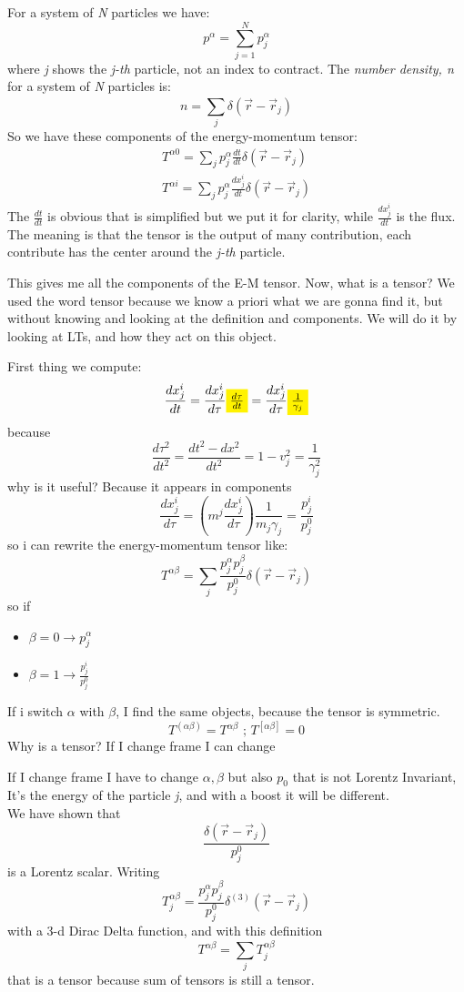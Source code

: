 For a system of \emph{N} particles we have: 
\[
p^{\alpha } = \sum_{j=1}^{N}{p^{\alpha }_{j}}	 
\]
where \emph{j} shows the \emph{j-th} particle, not an index to contract.
The \emph{number density, n} for a system of \emph{N} particles is:
\[
n = \sum_{j}^{}{\delta\left( \vec{r}-\vec{r}_{j} \right)}
\]
So we have these components of the energy-momentum tensor:
\begin{gather*}
T^{\alpha 0} = \sum_{j}^{}{p^{\alpha }_{j} \frac{dt}{dt} \delta\left( \vec{r}-\vec{r}_{j} \right)} \\
T^{\alpha i} = \sum_{j}^{}{p^{\alpha }_{j} \frac{dx^{i}_{j}}{dt} \delta\left( \vec{r}-\vec{r}_{j} \right) }
\end{gather*}
The $\frac{dt}{dt}$ is obvious that is simplified but we put it for clarity, while $ \frac{dx^{i}_{j}}{dt} $ is the flux.
The meaning is that the tensor is the output of many contribution, each contribute has the center around the \emph{j-th} particle.

This gives me all the components of the E-M tensor. Now, what is a tensor? We used the word tensor because we know a priori what we are gonna find it, but without knowing and looking at the definition and components. We will do it by looking at LTs, and how they act on this object.

First thing we compute:
\[
\frac{ dx^{i}_{j}}{dt} = \frac{ dx^{i}_{j}}{d\tau } \colorbox{yellow}{$ \frac{d\tau }{dt}$} = \frac{dx^{i}_{j}}{d\tau } \colorbox{yellow}{$ \frac{1}{\gamma_{j}}$}
\]
because
\[
\frac{d\tau ^{2}}{dt^{2}} = \frac{dt^{2}-dx^{2}}{dt^{2}} = 1 - v^{2}_{j} = \frac{1}{\gamma^{2}_{j}}
\]
why is it useful? Because it appears in components
\[
\frac{dx^{i}_{j}}{d\tau } = \left( m^{j} \frac{dx^{i}_{j}}{d\tau } \right) \frac{1}{m_{j}\gamma_{j}} = \frac{p^{i}_{j}}{p^{0}_{j}}		
\]
so i can rewrite the energy-momentum tensor like:
\[
T^{\alpha \beta } = \sum_{j}^{}{\frac{ p^{\alpha }_{j}p^{\beta }_{j}}{p^{0}_{j}}\delta\left( \vec{r}-\vec{r}_{j} \right)}
\]
so if 
\begin{itemize}
	\item $\beta =0 \to p^{\alpha }_{j}$ 
	\item $\beta =1 \to \frac{p^{i}_{j}}{p^{0}_{j}}$
\end{itemize}
If i switch $\alpha $ with $\beta $, I find the same objects, because the tensor is symmetric.
\[
	T^{\left( \alpha \beta  \right)} = T^{\alpha \beta } \text{  ;   } T^{[\alpha \beta ]} = 0
\]
Why is a tensor? If I change frame I can change 

If I change frame I have to change $\alpha , \beta $ but also $p_{0}$ that is not Lorentz Invariant, It's the energy of the particle \emph{j}, and with a boost it will be different.\\
We have shown that 
\[
\frac{\delta\left( \vec{r}-\vec{r}_{j} \right)}{p^{0}_{j}}
\]
is a Lorentz scalar. 
Writing
\[
T^{\alpha \beta }_{j}= \frac{p^{\alpha }_{j}p^{\beta }_{j}}{p^{0}_{j}} \delta^{\left( 3 \right)}\left( \vec{r}-\vec{r}_{j} \right) 
\]
with a 3-d Dirac Delta function, and with this definition 
\[
T^{\alpha  \beta } = \sum_{j}^{}{T^{\alpha \beta }_{j}}
\]
that is a tensor because sum of tensors is still a tensor.

